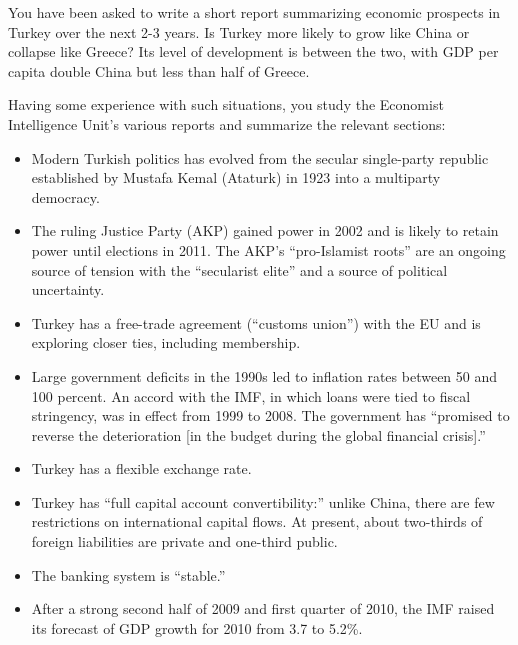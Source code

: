 \documentclass[letterpaper,12pt]{article}
\begin{document}
You have been asked to write a short report summarizing 
economic prospects in Turkey over the next 2-3 years.  
Is Turkey more likely to grow like China or collapse like Greece?  
Its level of development is between the two, 
with GDP per capita double China but less than half of Greece. 

Having some experience with such situations, 
you study the Economist Intelligence Unit's 
various reports and summarize the relevant sections:  
%
\begin{itemize}
\item Modern Turkish politics has evolved from the secular 
single-party republic established by Mustafa Kemal (Ataturk) in 1923 into 
a multiparty democracy.  

\item The ruling Justice Party (AKP) gained power in 2002 and is likely to retain power until elections in 2011.  
    The AKP's ``pro-Islamist roots'' are an ongoing source of tension
    with the ``secularist elite'' and a source of 
    political uncertainty.  

\item Turkey has a free-trade agreement (``customs union'') 
with the EU and is exploring closer ties, including membership.  

\item Large government deficits in the 1990s led to inflation rates between 50 and 100 percent. 
    An accord with the IMF, in which loans were tied to fiscal stringency,
    was in effect from 1999 to 2008.  
    The government has ``promised to reverse the deterioration [in 
    the budget during the global financial crisis].''
    
\item Turkey has a flexible exchange rate.  

\item Turkey has ``full capital account convertibility:''
unlike China, there are few restrictions on international capital flows.  
At present, about two-thirds of foreign liabilities are private 
and one-third public.  

\item The banking system is ``stable.'' 

\item After a strong second half of 2009 and first quarter of 2010, 
the IMF raised its forecast of GDP growth for 2010 from 3.7 to 5.2\%.  
\end{itemize}
\end{document}
